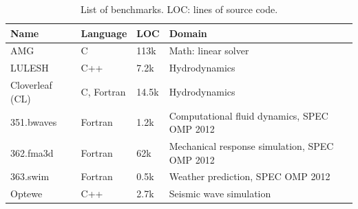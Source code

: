\begin {table}[t]
\caption{List of benchmarks. LOC: lines of source code.}
\vspace{-2mm}
\centering
{\footnotesize
\label{table:apps}
\begin{tabular}{ p{2.5cm}p{2cm}p{1cm}p{7.1cm}}
\textbf{Name} & \textbf{Language} & \textbf{LOC} &  \textbf{ Domain} \\
\hline
AMG & C & 113k & Math: linear solver \\ \hline
LULESH & C++ & 7.2k & Hydrodynamics \\ \hline
Cloverleaf (CL) & C, Fortran & 14.5k & Hydrodynamics\\ \hline
351.bwaves & Fortran& 1.2k & Computational fluid dynamics, SPEC OMP 2012 \\ \hline
362.fma3d & Fortran& 62k & Mechanical response simulation, SPEC OMP 2012 \\ \hline
363.swim & Fortran& 0.5k & Weather prediction, SPEC OMP 2012 \\ \hline
Optewe & C++& 2.7k & Seismic wave simulation \\ \hline
\end{tabular}
}
\end {table}

